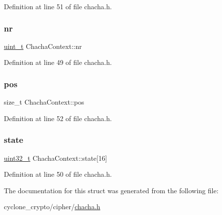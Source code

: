 Definition at line 51 of file chacha.\+h.

\mbox{\label{structChachaContext_a090120c0379bab4a191d22b52d1cc679}} 
\subsubsection{\texorpdfstring{nr}{nr}}
{\footnotesize\ttfamily \hyperlink{compiler__port_8h_a12a1e9b3ce141648783a82445d02b58d}{uint\+\_\+t} Chacha\+Context\+::nr}



Definition at line 49 of file chacha.\+h.

\mbox{\label{structChachaContext_aa5c55f8bef7d138c7403440d421ef98a}} 
\subsubsection{\texorpdfstring{pos}{pos}}
{\footnotesize\ttfamily size\+\_\+t Chacha\+Context\+::pos}



Definition at line 52 of file chacha.\+h.

\mbox{\label{structChachaContext_a0930b5fb8738edf5d43a5c21a8d4bc33}} 
\subsubsection{\texorpdfstring{state}{state}}
{\footnotesize\ttfamily \hyperlink{stdint_8h_a435d1572bf3f880d55459d9805097f62}{uint32\+\_\+t} Chacha\+Context\+::state\mbox{[}16\mbox{]}}



Definition at line 50 of file chacha.\+h.



The documentation for this struct was generated from the following file\+:\begin{DoxyCompactItemize}
\item 
cyclone\+\_\+crypto/cipher/\hyperlink{chacha_8h}{chacha.\+h}\end{DoxyCompactItemize}
